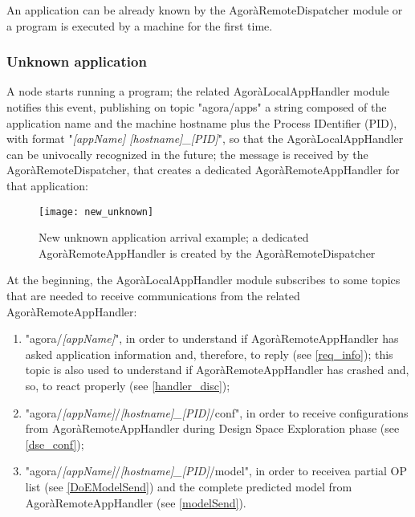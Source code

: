 An application can be already known by the AgoràRemoteDispatcher module or a program is executed by a machine for the first time.

\subsubsection{Unknown application}

A node starts running a program; the related AgoràLocalAppHandler module notifies this event, publishing on topic "agora/apps" a string composed of the application name and the machine hostname plus the Process IDentifier (PID), with format "\textit{[appName] [hostname]\_[PID]}", so that the AgoràLocalAppHandler can be univocally recognized in the future; the message is received by the AgoràRemoteDispatcher, that creates a dedicated AgoràRemoteAppHandler for that application:

\begin{figure}[H]

    \centering
    \texttt{[image: new\_unknown]}
    \caption{New unknown application arrival example; a dedicated AgoràRemoteAppHandler is created by the AgoràRemoteDispatcher}
    
\end{figure}

At the beginning, the AgoràLocalAppHandler module subscribes to some topics that are needed to receive communications from the related AgoràRemoteAppHandler:

\begin{enumerate}

    \item "agora/\textit{[appName]}", in order to understand if AgoràRemoteAppHandler has asked application information and, therefore, to reply (see \ref{req_info}); this topic is also used to understand if AgoràRemoteAppHandler has crashed and, so, to react properly (see \ref{handler_disc});
    
    \item "agora/\textit{[appName]}/\textit{[hostname]\_[PID]}/conf", in order to receive configurations from AgoràRemoteAppHandler during Design Space Exploration phase (see \ref{dse_conf});
    
    \item "agora/\textit{[appName]}/\textit{[hostname]\_[PID]}/model", in order to receive\linebreak a partial OP list (see \ref{DoEModelSend}) and the complete predicted model from AgoràRemoteAppHandler (see \ref{modelSend}).

\end{enumerate}

